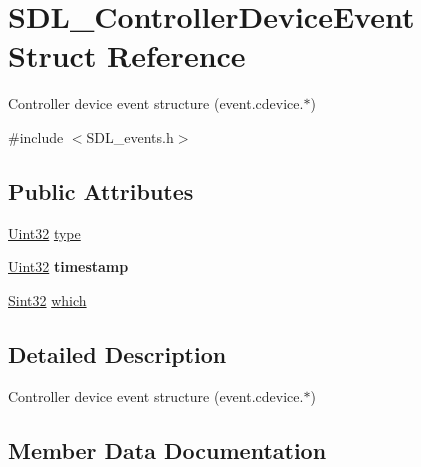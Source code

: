 \hypertarget{struct_s_d_l___controller_device_event}{}\section{S\+D\+L\+\_\+\+Controller\+Device\+Event Struct Reference}
\label{struct_s_d_l___controller_device_event}


Controller device event structure (event.\+cdevice.$\ast$)  




{\ttfamily \#include $<$S\+D\+L\+\_\+events.\+h$>$}

\subsection*{Public Attributes}
\begin{DoxyCompactItemize}
\item 
\hyperlink{_s_d_l__stdinc_8h_add440eff171ea5f55cb00c4a9ab8672d}{Uint32} \hyperlink{struct_s_d_l___controller_device_event_a45b3807eaf70a5f5cf712455da277536}{type}
\item 
\mbox{\label{struct_s_d_l___controller_device_event_a62945795fc17f5000fddc80e2cf921b8}} 
\hyperlink{_s_d_l__stdinc_8h_add440eff171ea5f55cb00c4a9ab8672d}{Uint32} {\bfseries timestamp}
\item 
\hyperlink{_s_d_l__stdinc_8h_a7a90b941db9d4582e9ad7abb9940ff7e}{Sint32} \hyperlink{struct_s_d_l___controller_device_event_accb80de1619c1e790cffb6c888c915db}{which}
\end{DoxyCompactItemize}


\subsection{Detailed Description}
Controller device event structure (event.\+cdevice.$\ast$) 

\subsection{Member Data Documentation}
\mbox{\label{struct_s_d_l___controller_device_event_a45b3807eaf70a5f5cf712455da277536}} 

